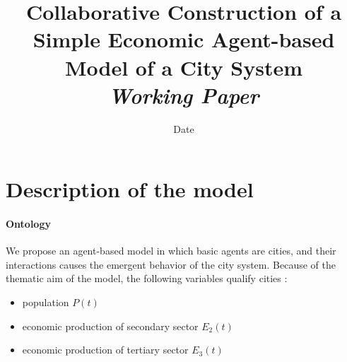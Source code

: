 


\title{Collaborative Construction of a Simple Economic Agent-based Model of a City System\bigskip\\
\textit{Working Paper}
}
\author{}
\date{Date}


\maketitle

\justify


\begin{abstract}

\end{abstract}




\section{Description of the model}


\paragraph{Ontology} We propose an agent-based model in which basic agents are cities, and their interactions causes the emergent behavior of the city system. Because of the thematic aim of the model, the following variables qualify cities :
\begin{itemize}
\item population $P(t)$
\item economic production of secondary sector $E_2(t)$
\item economic production of tertiary sector $E_3(t)$
\end{itemize}
















%



